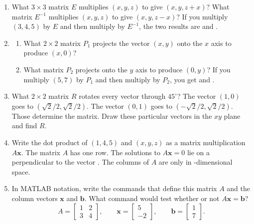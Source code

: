 \documentclass[14pt, a4paper]{article}
\begin{document}
\begin{enumerate}[resume]
    \item What $3 \times 3$ matrix $E$ multiplies $(x, y, z)$ to give $(x, y, z + x)$? What matrix $E^{-1}$ multiplies $(x, y, z)$ to give $(x, y, z - x)$? If you multiply $(3,4,5)$ by $E$ and then multiply by $E^{-1}$, the two results are \underline{\hspace{2cm}} and \underline{\hspace{2cm}}.

    \item
          \begin{enumerate}
              \item[(a)] What $2 \times 2$ matrix $P_1$ projects the vector $(x, y)$ onto the $x$ axis to produce $(x, 0)$?
              \item[(b)] What matrix $P_2$ projects onto the $y$ axis to produce $(0, y)$? If you multiply $(5,7)$ by $P_1$ and then multiply by $P_2$, you get \underline{\hspace{2cm}} and \underline{\hspace{2cm}}.
          \end{enumerate}

    \item What $2 \times 2$ matrix $R$ rotates every vector through $45^\circ$? The vector $(1,0)$ goes to $(\sqrt{2}/2, \sqrt{2}/2)$. The vector $(0,1)$ goes to $(-\sqrt{2}/2, \sqrt{2}/2)$. Those determine the matrix. Draw these particular vectors in the $xy$ plane and find $R$.

    \item Write the dot product of $(1,4,5)$ and $(x, y, z)$ as a matrix multiplication $A\boldsymbol{x}$. The matrix $A$ has one row. The solutions to $A\boldsymbol{x} = 0$ lie on a \underline{\hspace{2cm}} perpendicular to the vector \underline{\hspace{2cm}}. The columns of $A$ are only in \underline{\hspace{2cm}}-dimensional space.

    \item In \textcolor{blue!60!white}{MATLAB} notation, write the commands that define this matrix $A$ and the column vectors $\boldsymbol{x}$ and $\boldsymbol{b}$. What command would test whether or not $A\boldsymbol{x} = \boldsymbol{b}$?
          \[
              A = \begin{bmatrix} 1 & 2 \\ 3 & 4 \end{bmatrix}, \qquad
              \boldsymbol{x} = \begin{bmatrix} 5 \\ -2 \end{bmatrix}, \qquad
              \boldsymbol{b} = \begin{bmatrix} 1 \\ 7 \end{bmatrix}.
          \]


\end{enumerate}
\end{document}
